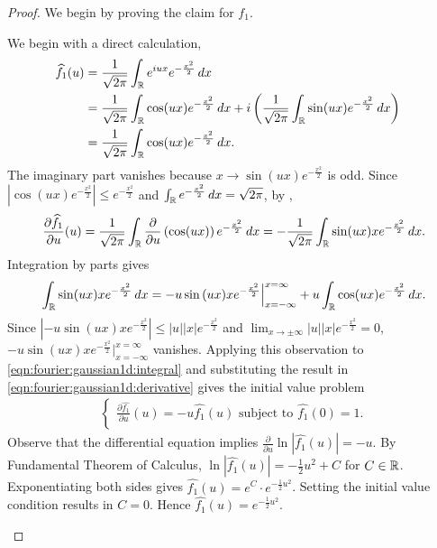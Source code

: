 \begin{proof}
We begin by proving the claim for $f_1$.
\setcounter{step}{0}
\begin{step}
\label{thm:fourier:gaussian:step:1}
We begin with a direct calculation, \begin{align*}
    \widehat{f_1}(u) &=  \frac{1}{\sqrt{2 \pi}} \int_{\mathbb R} e^{iux} e^{-\frac{x^2}{2}} \, dx & \\ 
                     &=  \frac{1}{\sqrt{2 \pi}} \int_{\mathbb R} \cos(ux) e^{-\frac{x^2}{2}} \, dx + i \left (  \frac{1}{\sqrt{2 \pi}} \int_{\mathbb R} \sin(ux) e^{-\frac{x^2}{2}} \, dx  \right) & \\ 
                     &=  \frac{1}{\sqrt{2 \pi}} \int_{\mathbb R} \cos(ux) e^{-\frac{x^2}{2}} \, dx.
\end{align*}
The imaginary part vanishes because  $x \to \sin(ux) e^{-\frac{x^2}{2}}$ is odd.
Since $|\cos(ux) e^{-\frac{x^2}{2}}| \leq e^{-\frac{x^2}{2}}$ and $\int_{\mathbb R} e^{-\frac{x^2}{2}} \, dx = \sqrt{2 \pi}$, by , \begin{align}
    \label{eqn:fourier:gaussian1d:derivative}
    \frac{\partial \widehat{f_1}}{\partial u} (u) = \frac{1}{\sqrt{2 \pi}}  \int_{\mathbb R} \frac{\partial}{\partial u} \left(\cos(ux)\right)  e^{-\frac{x^2}{2}}\, dx = -\frac{1}{\sqrt{2\pi}} \int_{\mathbb R} \sin(ux) x  e^{-\frac{x^2}{2}}\, dx .
\end{align}
Integration by parts gives \begin{align}
    \label{eqn:fourier:gaussian1d:integral}
    \int_{{\mathbb R}} \sin(ux) x  e^{-\frac{x^2}{2}}  \, dx = - u\sin{(ux)} x e^{-\frac{x^2}{2}} \Big|_{x = -\infty}^{x = \infty} + u \int_{\mathbb R} \cos(ux) e^{-\frac{x^2}{2}} \, dx.
\end{align}
Since $|- u\sin{(ux)} x e^{-\frac{x^2}{2}} | \leq |u| |x| e^{-\frac{x^2}{2}}$ and $\lim_{x \to \pm \infty}  |u||x| e^{-\frac{x^2}{2}} = 0$, $- u\sin{(ux)} x e^{-\frac{x^2}{2}} \Big|_{x = -\infty}^{x = \infty}$ vanishes. Applying this observation to \ref{eqn:fourier:gaussian1d:integral} and substituting the result in \ref{eqn:fourier:gaussian1d:derivative} gives the initial value problem 
\begin{align*}
    \begin{cases}
        \frac{\partial \widehat{f_1}}{\partial u} (u) = - u \widehat{f_1}(u) \text{ subject to } \widehat{f_1}(0) = 1. \\
    \end{cases}
\end{align*}
Observe that the differential equation implies $ \frac{\partial}{\partial u} \ln{|\widehat{f_1}(u)|} = -u$. By Fundamental Theorem of Calculus, $\ln | \widehat{f_1}(u) | = -\frac{1}{2}u^2 + C$ for $C \in {\mathbb R}$. Exponentiating both sides gives $ \widehat{f_1}(u) = e^{C} \cdot e^{-\frac{1}{2}u^2 }$. Setting the initial value condition results in $C = 0$. Hence $\widehat{f_1}(u) = e^{-\frac{1}{2}u^2 }$.

\end{step}
\end{proof}
